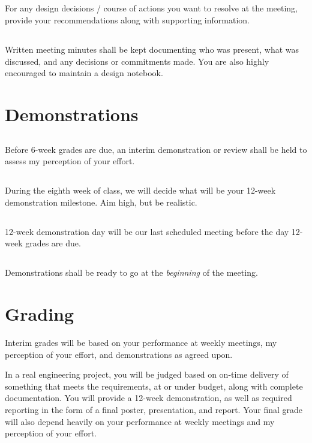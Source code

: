 \documentclass[10pt,courier]{navymemo}
\begin{document}
\subsection{} For any design decisions / course of actions you want to resolve at the meeting, provide your recommendations along with supporting information.
\subsection{} Written meeting minutes shall be kept documenting who was present, what was discussed, and any decisions or commitments made.  You are also highly encouraged to maintain a design notebook. 

\newpage
\section{Demonstrations} 
\subsection{} Before 6-week grades are due, an interim demonstration or review shall be held to assess my perception of your effort.
\subsection{} During the eighth week of class, we will decide what will be your 12-week demonstration milestone. Aim high, but be realistic.
\subsection{} 12-week demonstration day will be our last scheduled meeting before the day 12-week grades are due.
\subsection{} Demonstrations shall be ready to go at the \emph{beginning} of the meeting.

\section{Grading}
Interim grades will be based on your performance at weekly meetings, my perception of your effort, and demonstrations as agreed upon.  

In a real engineering project, you will be judged based on on-time delivery of something that meets the requirements, at or under budget, along with complete documentation. You will provide a 12-week demonstration, as well as required reporting in the form of a final poster, presentation, and report. Your final grade will also depend heavily on your performance at weekly meetings and my perception of your effort.
\end{document}
